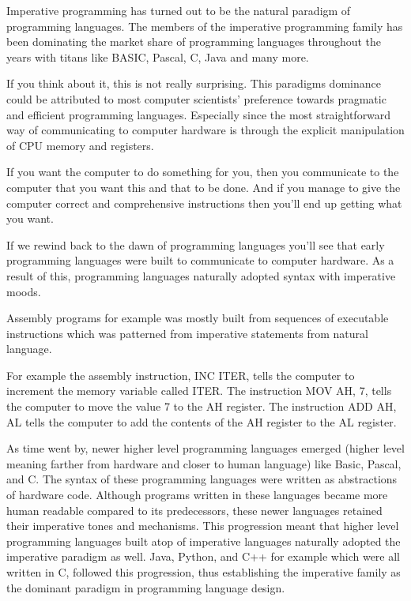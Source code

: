 Imperative programming has turned out to be the natural paradigm of
programming languages. The members of the imperative programming family
has been dominating the market share of programming languages throughout
the years with titans like BASIC, Pascal, C, Java and many more.

If you think about it, this is not really surprising. This paradigms
dominance could be attributed to most computer scientists' preference
towards pragmatic and efficient programming languages. Especially since
the most straightforward way of communicating to computer hardware is
through the explicit manipulation of CPU memory and registers.

If you want the computer to do something for you, then you communicate
to the computer that you want this and that to be done. And if you
manage to give the computer correct and comprehensive instructions then
you'll end up getting what you want.

If we rewind back to the dawn of programming languages you'll see that
early programming languages were built to communicate to computer
hardware. As a result of this, programming languages naturally adopted
syntax with imperative moods.

Assembly programs for example was mostly built from sequences of
executable instructions which was patterned from imperative statements
from natural language.

\begin{Shaded}
\begin{Highlighting}[]
\end{Highlighting}
\end{Shaded}

For example the assembly instruction, INC ITER, tells the computer to
increment the memory variable called ITER. The instruction MOV AH, 7,
tells the computer to move the value 7 to the AH register. The
instruction ADD AH, AL tells the computer to add the contents of the AH
register to the AL register.

As time went by, newer higher level programming languages emerged
(higher level meaning farther from hardware and closer to human
language) like Basic, Pascal, and C. The syntax of these programming
languages were written as abstractions of hardware code. Although
programs written in these languages became more human readable compared
to its predecessors, these newer languages retained their imperative
tones and mechanisms. This progression meant that higher level
programming languages built atop of imperative languages naturally
adopted the imperative paradigm as well. Java, Python, and C++ for
example which were all written in C, followed this progression, thus
establishing the imperative family as the dominant paradigm in
programming language design.

